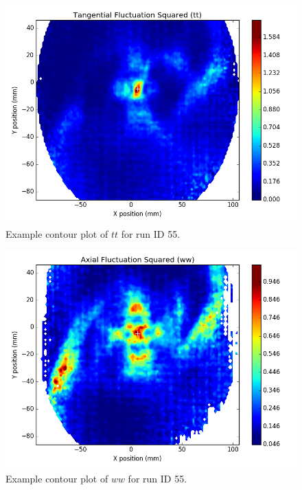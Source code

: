 \begin{figure}[H]
	\centering
	\includegraphics[width=5in]{figs/example_vortex_figs/example_tt_contour}
\caption{Example contour plot of $tt$ for run ID 55.}
\label{fig:examp_tt}
\end{figure}

\begin{figure}[H]
	\centering
	\includegraphics[width=5in]{figs/example_vortex_figs/example_ww_contour}
\caption{Example contour plot of $ww$ for run ID 55.}
\label{fig:examp_ww}
\end{figure}

